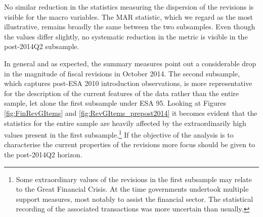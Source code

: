 


No similar reduction in the statistics measuring the dispersion of the revisions is visible for the macro variables. The MAR statistic, which we regard as the most illustrative, remains broadly the same between the two subsamples. Even though the values differ slightly, no systematic reduction in the metric is visible in the post-2014Q2 subsample.

In general and as expected, the summary measures point out a considerable drop in the magnitude of fiscal revisions in October 2014. The second subsample, which captures post-ESA 2010 introduction observations, is more representative for the description of the current features of the data rather than the entire sample, let alone the first subsample under ESA 95. Looking at Figures \ref{fig:FinRevGItems} and \ref{fig:RevGItems_prepost2014} it becomes evident that the statistics for the entire sample are heavily affected by the extraordinarily high values present in the first subsample.\footnote{Some extraordinary values of the revisions in the first subsample may relate to the Great Financial Crisis. At the time governments undertook multiple support measures, most notably to assist the financial sector. The statistical recording of the associated transactions was more uncertain than usually.} If the objective of the analysis is to characterise the current properties of the revisions more focus should be given to the post-2014Q2 horizon. 

